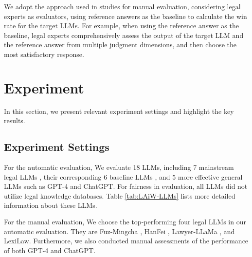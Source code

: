 We adopt the approach used in studies \cite{dubois2023alpacafarm,alpaca_eval} for manual evaluation, considering legal experts as evaluators, using reference answers as the baseline to calculate the win rate for the target LLMs. 
For example, when using the reference answer as the baseline, legal experts comprehensively assess the output of the target LLM and the reference answer from multiple judgment dimensions, and then choose the most satisfactory response. 

\section{Experiment}

In this section, we present relevant experiment settings and highlight the key results.

\subsection{Experiment Settings}
\label{sec:auto evaluation}
For the automatic evaluation, We evaluate 18 LLMs, including 7 mainstream legal LLMs \cite{cui2023chatlaw, LAWGPT}, their corresponding 6 baseline LLMs \cite{du2022glm, chinese-llama-alpaca, zhang2022recognition}, and 5 more effective general LLMs \cite{baichuan2023baichuan2, touvron2023llama} such as GPT-4 and ChatGPT. For fairness in evaluation, all LLMs did not utilize legal knowledge databases. Table \ref{tab:LAiW-LLMs} lists more detailed information about these LLMs.

For the manual evaluation, We choose the top-performing four legal LLMs in our automatic evaluation. They are Fuz-Mingcha \cite{fuzi.mingcha}, HanFei \cite{HanFei}, Lawyer-LLaMa \cite{lawyer-llama-report}, and LexiLaw. Furthermore, we also conducted manual assessments of the performance of both GPT-4 and ChatGPT.

    

        

